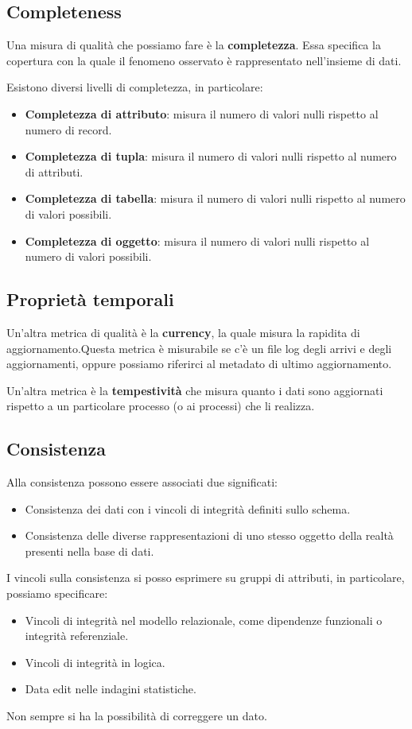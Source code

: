 \subsection{Completeness}
Una misura di qualità che possiamo fare è la \textbf{completezza}. Essa specifica la
copertura con la quale il fenomeno osservato è rappresentato nell'insieme di dati.

Esistono diversi livelli di completezza, in particolare:
\begin{itemize}
      \item \textbf{Completezza di attributo}: misura il numero di valori nulli
            rispetto al numero di record.
      \item \textbf{Completezza di tupla}: misura il numero di valori nulli rispetto
            al numero di attributi.
      \item \textbf{Completezza di tabella}: misura il numero di valori nulli
            rispetto al numero di valori possibili.
      \item \textbf{Completezza di oggetto}: misura il numero di valori nulli
            rispetto al numero di valori possibili.
\end{itemize}
\subsection{Proprietà temporali}
Un'altra metrica di qualità è la \textbf{currency}, la quale misura la rapidita
di aggiornamento.Questa metrica è misurabile se c'è un file log degli arrivi e
degli aggiornamenti, oppure possiamo riferirci al metadato di ultimo aggiornamento.

Un'altra metrica è la \textbf{tempestività} che misura quanto i dati sono aggiornati
rispetto a un particolare processo (o ai processi) che li realizza.
\subsection{Consistenza}
Alla consistenza possono essere associati due significati:
\begin{itemize}
      \item Consistenza dei dati con i vincoli di integrità definiti sullo schema.
      \item Consistenza delle diverse rappresentazioni di uno stesso oggetto
            della realtà presenti nella base di dati.
\end{itemize}
I vincoli sulla consistenza si posso esprimere su gruppi di attributi, in particolare,
possiamo specificare:
\begin{itemize}
      \item Vincoli di integrità nel modello relazionale, come dipendenze funzionali
            o integrità referenziale.
      \item Vincoli di integrità in logica.
      \item Data edit nelle indagini statistiche.
\end{itemize}
\begin{nota}
      Non sempre si ha la possibilità di correggere un dato.
\end{nota}

